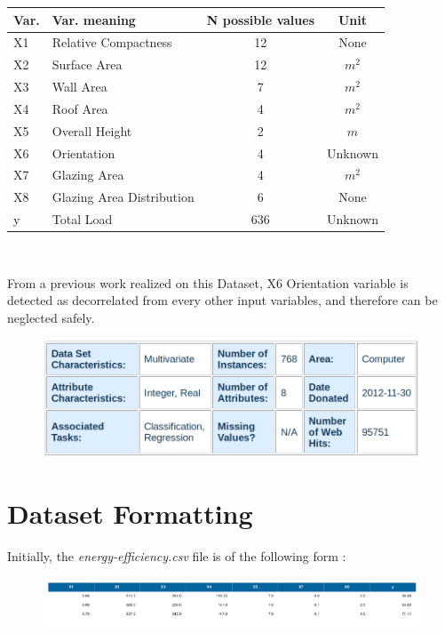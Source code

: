 \documentclass[a4paper, 11pt]{article}
\begin{document}
\begin{center}
\begin{tabular}{llcc}
  \hline
  Var. & Var. meaning & N possible values & Unit \\
  \hline
  X1 & Relative Compactness & 12 & None \\
  X2 & Surface Area & 12 & $m^2$\\
  X3 & Wall Area & 7 & $m^2$\\
  X4 & Roof Area & 4 & $m^2$\\
  X5 & Overall Height & 2 & $m$\\
  X6 & Orientation & 4 & Unknown\\
  X7 & Glazing Area & 4 & $m^2$\\
  X8 & Glazing Area Distribution & 6 & None \\
  y & Total Load & 636 & Unknown \\
\end{tabular}\\
\end{center}

From a previous work realized on this Dataset, X6 Orientation variable is
detected as decorrelated from every other input variables, and therefore
can be neglected safely.

\begin{figure}[H]
\begin{center}
  \includegraphics[scale=0.38]{../figures_trabalho_final/resume_dataset.png}
\end{center}
\end{figure}

\section{Dataset Formatting}

Initially, the \emph{energy-efficiency.csv} file is of the following form :
\begin{figure}[H]
\begin{center}
  \includegraphics[width=\textwidth]{../figures_trabalho_final/step_df.png}
\end{center}
\end{figure}
\end{document}
